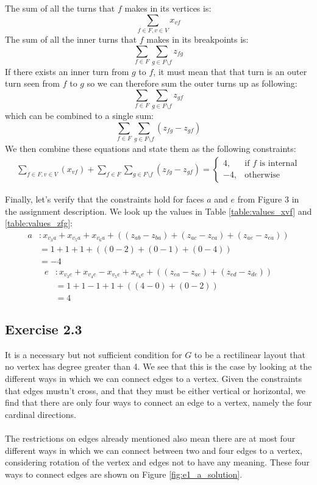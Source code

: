 \documentclass[12pt]{article}
\begin{document}
  The sum of all the turns that $f$ makes in its vertices is:
  $$\sum_{f \in F, v \in V}{x_{vf}}$$
  The sum of all the inner turns that $f$ makes in its breakpoints is:
  $$\sum_{f \in F}\sum_{g \in F \setminus f}z_{fg}$$
  If there exists an inner turn from $g$ to $f$, it must mean that that turn is an outer turn seen from $f$ to $g$ so we can therefore sum the outer turns up as following:
  $$\sum_{f \in F}\sum_{g \in F \setminus f}z_{gf}$$
  which can be combined to a single sum:
  $$\sum_{f \in F}\sum_{g \in F \setminus f}(z_{fg} - z_{gf})$$
  We then combine these equations and state them as the following constraints:
  \begin{align*}
      \sum_{f \in F, v \in V}(x_{vf}) + \sum_{f \in F}\sum_{g \in F \setminus f}(z_{fg} - z_{gf}) = \begin{cases}
                                                                                       4, & \text{if } f \text{ is internal}\\
                                                                                      -4, & \text{otherwise}
                                                                                   \end{cases}
  \end{align*}

  Finally, let's verify that the constraints hold for faces $a$ and $e$ from Figure 3 in the assignment description. We look up the values in Table \ref{table:values_xvf} and \ref{table:values_zfg}:
  \begin{align*}
    a &: x_{v_{3}a} + x_{v_{5}a} + x_{v_{6}a} + ((z_{ab} - z_{ba}) + (z_{ac} - z_{ca}) + (z_{ae} - z_{ea}))\\
      &= 1 + 1 + 1 + ((0 - 2) + (0 - 1) + (0 - 4)) \\
      &= -4
  \end{align*}
  \begin{align*}
    e &: x_{v_{3}e} + x_{v_{4}e} - x_{v_{5}e} + x_{v_{6}e} + ((z_{ea} - z_{ae}) + (z_{ed} - z_{de}))\\
      &= 1 + 1 -1 + 1 + ((4 - 0) + (0 - 2)) \\
      &= 4
  \end{align*}

\subsection*{Exercise 2.3}
It is a necessary but not sufficient condition for $G$ to be a rectilinear layout that no vertex has degree greater than 4. We see that this is the case by looking at the different ways in which we can connect edges to a vertex. Given the constraints that edges mustn't cross, and that they must be either vertical or horizontal, we find that there are only four ways to connect an edge to a vertex, namely the four cardinal directions.\\
\\
The restrictions on edges already mentioned also mean there are at most four different ways in which we can connect between two and four edges to a vertex, considering rotation of the vertex and edges not to have any meaning. These four ways to connect edges are shown on Figure \ref{fig:e1_a_solution}.
\end{document}

